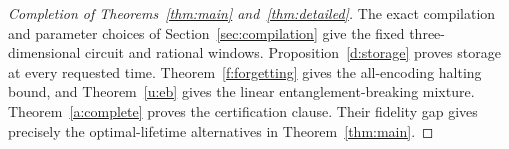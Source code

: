\begin{proof}[Completion of Theorems~\ref{thm:main} and~\ref{thm:detailed}]
The exact compilation and parameter choices of
Section~\ref{sec:compilation} give the fixed three-dimensional circuit
and rational windows. Proposition~\ref{d:storage} proves storage at
every requested time. Theorem~\ref{f:forgetting} gives the all-encoding
halting bound, and Theorem~\ref{u:eb} gives the linear entanglement-breaking mixture.
Theorem~\ref{a:complete} proves the certification clause. Their fidelity
gap gives precisely the optimal-lifetime alternatives in Theorem~\ref{thm:main}.
\end{proof}
